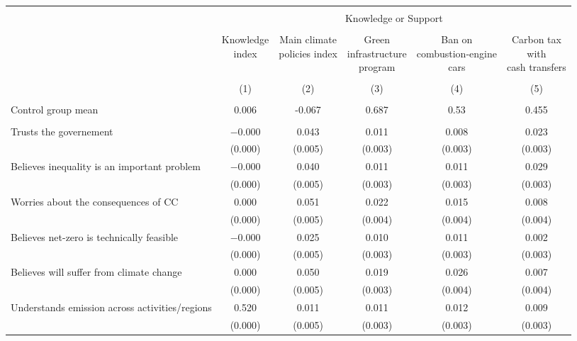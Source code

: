 
\begin{tabular}{@{\extracolsep{5pt}}lccccc} 
\\[-1.8ex]\hline 
\hline \\[-1.8ex] 
 & \multicolumn{5}{c}{Knowledge or Support} \\ 
\cline{2-6} 
\\[-1.8ex] & \makecell{Knowledge\\index} & \makecell{Main climate\\policies index} & \makecell{Green\\infrastructure\\program} & \makecell{Ban on\\combustion-engine\\cars} & \makecell{Carbon tax\\with\\cash transfers} \\ 
\\[-1.8ex] & (1) & (2) & (3) & (4) & (5)\\ 
\hline \\[-1.8ex] 
Control group mean & 0.006 & -0.067 & 0.687 & 0.53 & 0.455  \\ \hline \\[-1.8ex]
 Trusts the governement & $-$0.000 & 0.043 & 0.011 & 0.008 & 0.023 \\ 
  & (0.000) & (0.005) & (0.003) & (0.003) & (0.003) \\ 
  Believes inequality is an important problem & $-$0.000 & 0.040 & 0.011 & 0.011 & 0.029 \\ 
  & (0.000) & (0.005) & (0.003) & (0.003) & (0.003) \\ 
  Worries about the consequences of CC & 0.000 & 0.051 & 0.022 & 0.015 & 0.008 \\ 
  & (0.000) & (0.005) & (0.004) & (0.004) & (0.004) \\ 
  Believes net-zero is technically feasible & $-$0.000 & 0.025 & 0.010 & 0.011 & 0.002 \\ 
  & (0.000) & (0.005) & (0.003) & (0.003) & (0.003) \\ 
  Believes will suffer from climate change & 0.000 & 0.050 & 0.019 & 0.026 & 0.007 \\ 
  & (0.000) & (0.005) & (0.003) & (0.004) & (0.004) \\ 
  Understands emission across activities/regions & 0.520 & 0.011 & 0.011 & 0.012 & 0.009 \\ 
  & (0.000) & (0.005) & (0.003) & (0.003) & (0.003) \\ 

\end{tabular}
